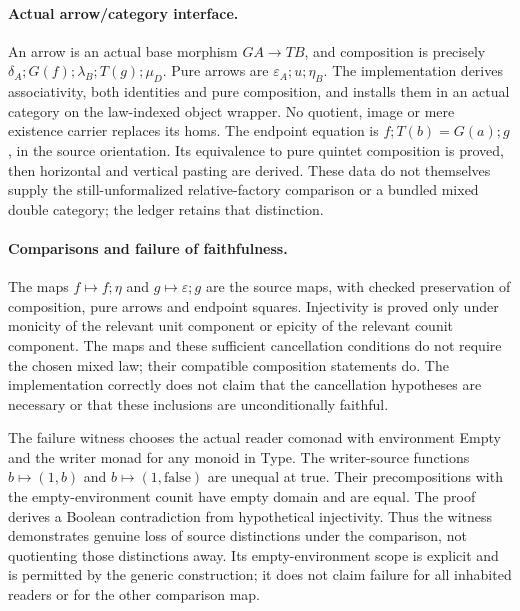 \documentclass{article}
\begin{document}
\paragraph{Actual arrow/category interface.}
An arrow is an actual base morphism $GA\to TB$, and composition is precisely $\delta_A;G(f);\lambda_B;T(g);\mu_D$. Pure arrows are $\varepsilon_A;u;\eta_B$. The implementation derives associativity, both identities and pure composition, and installs them in an actual category on the law-indexed object wrapper. No quotient, image or mere existence carrier replaces its homs. The endpoint equation is $f;T(b)=G(a);g$, in the source orientation. Its equivalence to pure quintet composition is proved, then horizontal and vertical pasting are derived. These data do not themselves supply the still-unformalized relative-factory comparison or a bundled mixed double category; the ledger retains that distinction.

\paragraph{Comparisons and failure of faithfulness.}
The maps $f\mapsto f;\eta$ and $g\mapsto\varepsilon;g$ are the source maps, with checked preservation of composition, pure arrows and endpoint squares. Injectivity is proved only under monicity of the relevant unit component or epicity of the relevant counit component. The maps and these sufficient cancellation conditions do not require the chosen mixed law; their compatible composition statements do. The implementation correctly does not claim that the cancellation hypotheses are necessary or that these inclusions are unconditionally faithful.

The failure witness chooses the actual reader comonad with environment Empty and the writer monad for any monoid in Type. The writer-source functions $b\mapsto(1,b)$ and $b\mapsto(1,\mathrm{false})$ are unequal at true. Their precompositions with the empty-environment counit have empty domain and are equal. The proof derives a Boolean contradiction from hypothetical injectivity. Thus the witness demonstrates genuine loss of source distinctions under the comparison, not quotienting those distinctions away. Its empty-environment scope is explicit and is permitted by the generic construction; it does not claim failure for all inhabited readers or for the other comparison map.
\end{document}
